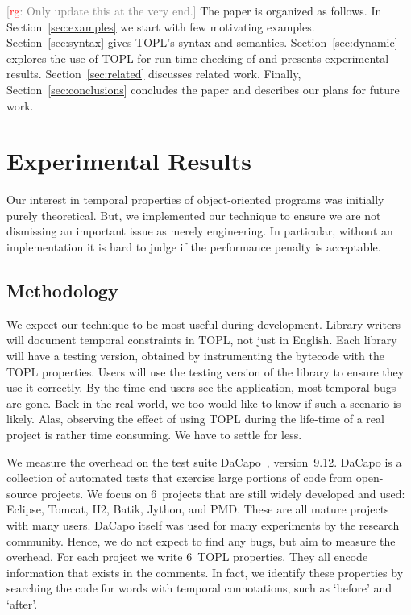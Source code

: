 \documentclass[10pt, preprint]{sigplanconf} %
\newcommand{\noterg}[2]{\textcolor{gray}{[\textcolor{red}{#1}: #2]}}
\newcommand{\rg}[1]{\noterg{rg}{#1}}
\begin{document}
\rg{Only update this at the very end.}
The paper is organized as follows.
In Section~\ref{sec:examples} we start with few motivating examples.
Section~\ref{sec:syntax} gives  TOPL's syntax  and semantics.
Section~\ref{sec:dynamic} explores the use of TOPL for run-time checking of and presents experimental results.
Section~\ref{sec:related} discusses related work.
Finally, Section~\ref{sec:conclusions} concludes the paper and describes our plans for future work.

\section{Experimental Results} %

Our interest in temporal properties of object-oriented programs was initially purely theoretical.
But, we implemented our technique to ensure we are not dismissing an important issue as merely engineering.
In particular, without an implementation it is hard to judge if the performance penalty is acceptable.

\subsection{Methodology} %

We expect our technique to be most useful during development.
Library writers will document temporal constraints in TOPL, not just in English.
Each library will have a testing version, obtained by instrumenting the bytecode with the TOPL properties.
Users will use the testing version of the library to ensure they use it correctly.
By the time end-users see the application, most temporal bugs are gone.
Back in the real world, we too would like to know if such a scenario is likely.
Alas, observing the effect of using TOPL during the life-time of a real project is rather time consuming.
We have to settle for less.

We measure the overhead on the test suite DaCapo~\cite{dblp:conf/oopsla/dacapo}, version~9.12.
DaCapo is a collection of automated tests that exercise large portions of code from open-source projects.
We focus on $6$~projects that are still widely developed and used: Eclipse, Tomcat, H2, Batik, Jython, and PMD\null.
These are all mature projects with many users.
DaCapo itself was used for many experiments by the research community.
Hence, we do not expect to find any bugs, but aim to measure the overhead.
For each project we write $6$~TOPL properties.
They all encode information that exists in the comments.
In fact, we identify these properties by searching the code for words with temporal connotations, such as `before' and `after'.
\end{document}
